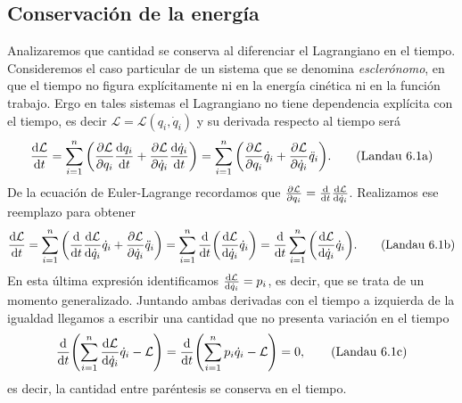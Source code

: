 \documentclass[12pt, spanish, a4paper, ]{article}
\begin{document}

\subsection{Conservación de la energía}\label{conservacionEnergia} %
Analizaremos que cantidad se conserva al diferenciar el Lagrangiano en el tiempo.
Consideremos el caso particular de un sistema que se denomina \emph{esclerónomo}, en que el tiempo no figura explícitamente ni en la energía cinética ni en la función trabajo.
Ergo en tales sistemas el Lagrangiano no tiene dependencia explícita con el tiempo, es decir \(\mathcal{L}= \mathcal{L}(q_i, \dot{q}_i)\) y su derivada respecto al tiempo será
\begin{equation}\label{Landau6.1a}
	\dv{\mathcal{L}}{t}= \sum_{i=1}^n \pqty{ \pdv{\mathcal{L}}{q_i} \dv{q_i}{t}+ \pdv{\mathcal{L}}{\dot{q}_i} \dv{\dot{q}_i}{t} }
	= \sum_{i=1}^n \pqty{ \pdv{\mathcal{L}}{q_i} \dot{q}_i+ \pdv{\mathcal{L}}{\dot{q}_i} \ddot{q}_i }.
    \tag{Landau 6.1a}
\end{equation}
De la ecuación de Euler-Lagrange recordamos que \(\pdv{\mathcal{L}}{q_i}= \dv{t} \dv{\mathcal{L}}{\dot{q}_i}\).
Realizamos ese reemplazo para obtener
\begin{equation}\label{Landau6.1b}
	\dv{\mathcal{L}}{t}= \sum_{i=1}^n \pqty{ \dv{t} \dv{\mathcal{L}}{\dot{q}_i} \dot{q}_i+ \pdv{\mathcal{L}}{\dot{q}_i} \ddot{q}_i }
	= \sum_{i=1}^n \dv{t} \pqty{ \dv{\mathcal{L}}{\dot{q}_i} \dot{q}_i }
	= \dv{t} \sum_{i=1}^n \pqty{ \dv{\mathcal{L}}{\dot{q}_i} \dot{q}_i }.
	\tag{Landau 6.1b}
\end{equation}
En esta última expresión identificamos \(\dv{\mathcal{L}}{\dot{q}_i}= p_i\), es decir, que se trata de un momento generalizado.
Juntando ambas derivadas con el tiempo a izquierda de la igualdad llegamos a escribir una cantidad que no presenta variación en el tiempo
\begin{equation}\label{Landau6.1c}
	\dv{t }\pqty{ \sum_{i=1}^n \dv{\mathcal{L}}{\dot{q}_i} \dot{q}_i - \mathcal{L}}= \dv{t} \pqty{ \sum_{i=1}^n p_i \dot{q}_i - \mathcal{L}}= 0,
	\tag{Landau 6.1c}
\end{equation}
es decir, la cantidad entre paréntesis se conserva en el tiempo.
\end{document}

